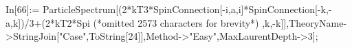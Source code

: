 In[66]:= ParticleSpectrum[(2*kT3*SpinConnection[-i,a,i]*SpinConnection[-k,-a,k])/3+(2*kT2*Spi (*omitted 2573 characters for brevity*) ,k,-k]],TheoryName->StringJoin["Case",ToString[24]],Method->"Easy",MaxLaurentDepth->3];